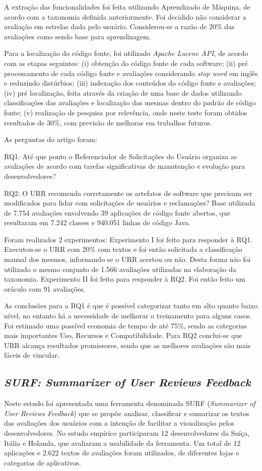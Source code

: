 A extração das funcionalidades foi feita utilizando Aprendizado de Máquina, de acordo com a taxonomia definida anteriormente. Foi decidido não considerar a avaliação em estrelas dada pelo usuário. Considerou-se a razão de 20\% das avaliações como sendo base para aprendizagem.

Para a localização do código fonte, foi utilizado \textit{Apache Lucene API}, de acordo com as etapas seguintes: (i) obtenção do código fonte de cada software; (ii) pré processamento de cada código fonte e avaliações considerando \textit{stop word} em inglês e reduzindo distúrbios; (iii) indexação dos conteúdos do código fonte e avaliações; (iv) pré localização, feita através da criação de uma base de dados utilizando classificações das avaliações e localização das mesmas dentro do padrão de código fonte; (v) realização de pesquisa por relevência, onde neste teste foram obtidos resultados de 30\%, com previsão de melhoras em trabalhos futuros.

As perguntas do artigo foram:

RQ1: Até que ponto o Referenciador de Solicitações do Usuário organiza as avaliações de acordo com tarefas significativas de manutenção e evolução para desenvolvedores?

RQ2: O URR recomenda corretamente os artefatos de software que precisam ser modificados para lidar com solicitações de usuários e reclamações?
Base utilizada de 7.754 avaliações envolvendo 39 aplicações de código fonte abertos, que resultaram em 7.242 classes e 940.051 linhas de código Java.

Foram realizados 2 experimentos:
Experimento I foi feito para responder à RQ1. Executou-se o URR com 20\% com textos e foi então solicitada a classificação manual dos mesmos, informando se o URR acertou ou não. Desta forma não foi utilizado o mesmo conjunto de 1.566 avaliações utilizadas na elaboração da taxonomia.
Experimento II foi feito para responder à RQ2. Foi então feito um oráculo com 91 avaliações.

As conclusões para a RQ1 é que é possível categorizar tanto em alto quanto baixo nível, no entanto há a necessidade de melhorar o treinamento para alguns casos. Foi estimado uma possível economia de tempo de até 75\%, sendo as categorias mais importantes Uso, Recursos e Compatibilidade.
Para RQ2 conclui-se que URR alcança resultados promissores, sendo que as melhores avaliações são mais fáceis de vincular.

\subsection{\textit{SURF: Summarizer of User Reviews Feedback}}
Neste estudo \cite{Sorbo2017surf} foi apresentada uma ferramenta denominada SURF (\textit{Summarizer of User Reviews Feedback}) que se propõe analisar, classificar e sumarizar os textos das avaliações dos usuários com a intenção de facilitar a visualização pelos desenvolvedores. No estudo empírico participaram 12 desenvolvedores da Suíça, Itália e Holanda, que avaliaram a usabilidade da ferramenta. Um total de 12 aplicações e 2.622 textos de avaliações foram utilizados, de diferentes lojas e categorias de aplicativos.

